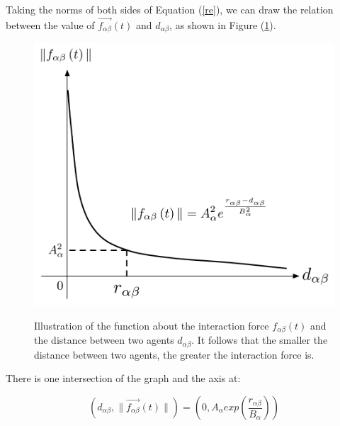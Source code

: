 
Taking the norms of both sides of Equation (\ref{re}), we can draw the relation between the value of $\overrightarrow{f_{\alpha\beta}}(t)$ and $ d_{\alpha\beta} $, as shown in Figure 
(\ref{fig:physicalinteraction2}).\\

\begin{figure}[hb]
    \centering
    {\includegraphics[scale=0.45]{Figures/physicalinteraction.pdf}} 
    \caption[Psysical interaction]{Illustration of the function about the interaction force 
        $f_{\alpha\beta}(t)$ and the distance between two agents
        $d_{\alpha \beta}$. It follows that the smaller the distance between two agents, the greater the interaction force is. }
    \label{fig:physicalinteraction2}
\end{figure}

There is one intersection of the graph and the  axis at:

\begin{equation}
	\left( d_{\alpha \beta} , \| \vec{f_{\alpha \beta}} \left( t \right) \| \right)
 =
	\left( 0 , A_{\alpha} exp\left( \frac{r_{\alpha\beta} }{B_{\alpha}}\right)  \right) 
\end{equation}

